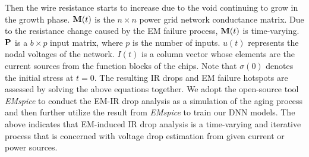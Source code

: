 Then the wire resistance starts to increase due to the void continuing to grow in the growth phase.  ${\bf M}(t)$ is the $n \times n$ power grid network conductance matrix. Due to the resistance change caused by the EM failure process, ${\bf M}(t)$ is time-varying. ${{\bf P}}$ is a $b \times p$ input matrix, where $p$ is the number of inputs. $u(t)$ represents the nodal voltages of the network. $I(t)$ is a column vector whose elements are the current sources from the function blocks of the chips. Note that $\sigma(0)$ denotes the initial stress at $t=0$. The resulting IR drops and EM failure hotspots are assessed by solving the above equations together. We adopt the open-source tool {\it EMspice} to conduct the EM-IR drop analysis as a simulation of the aging process and then further utilize the result from {\it EMspice} to train our DNN models.
The above indicates that EM-induced IR drop analysis is a time-varying and iterative process that is concerned with voltage drop estimation from given current or power sources.




